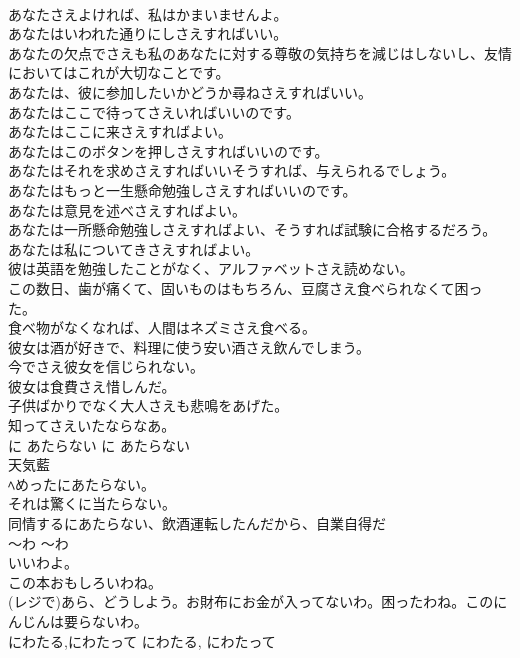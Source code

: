 \documentclass[8pt]{extreport}
\begin{document}
\begin{CJK}{UTF8}{min}
\\	あなたさえよければ、私はかまいませんよ。   
\\	あなたはいわれた通りにしさえすればいい。  
\\	あなたの欠点でさえも私のあなたに対する尊敬の気持ちを減じはしないし、友情においてはこれが大切なことです。   
\\	あなたは、彼に参加したいかどうか尋ねさえすればいい。   
\\	あなたはここで待ってさえいればいいのです。   
\\	あなたはここに来さえすればよい。   
\\	あなたはこのボタンを押しさえすればいいのです。   
\\	あなたはそれを求めさえすればいいそうすれば、与えられるでしょう。   
\\	あなたはもっと一生懸命勉強しさえすればいいのです。   
\\	あなたは意見を述べさえすればよい。   
\\	あなたは一所懸命勉強しさえすればよい、そうすれば試験に合格するだろう。   
\\	あなたは私についてきさえすればよい。   
\\	彼は英語を勉強したことがなく、アルファベットさえ読めない。  
\\	この数日、歯が痛くて、固いものはもちろん、豆腐さえ食べられなくて困った。  
\\	食べ物がなくなれば、人間はネズミさえ食べる。  
\\	彼女は酒が好きで、料理に使う安い酒さえ飲んでしまう。  
\\	今でさえ彼女を信じられない。   
\\	彼女は食費さえ惜しんだ。   
\\	子供ばかりでなく大人さえも悲鳴をあげた。   
\\	知ってさえいたならなあ。   
\\	に あたらない	に あたらない	
\\	天気藍
\\	ﾍめったにあたらない。   
\\	それは驚くに当たらない。  
\\	同情するにあたらない、飲酒運転したんだから、自業自得だ  
\\	〜わ	〜わ	
\\	いいわよ。  
\\	この本おもしろいわね。  
\\	(レジで)あら、どうしよう。お財布にお金が入ってないわ。困ったわね。このにんじんは要らないわ。  
\\	にわたる,にわたって	にわたる, にわたって	

\end{CJK}
\end{document}
